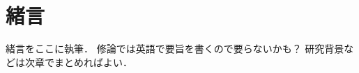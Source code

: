 \chapter{緒言}
\label{chap:Introdunction}

緒言をここに執筆．
修論では英語で要旨を書くので要らないかも？
研究背景などは次章でまとめればよい．

\textcolor{LightGray}{
}
